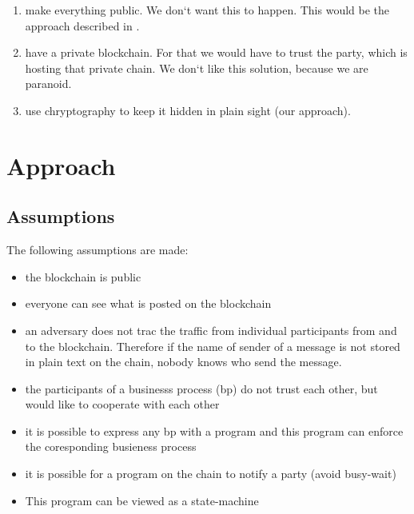 \documentclass[runningheads]{llncs}
\begin{document}
\begin{enumerate}
    \item make everything public. We don`t want this to happen. This would be the approach described in \cite{weber2016untrusted}.
    \item have a private blockchain. For that we would have to trust the party, which is hosting that private chain. We don`t like this solution, because we are paranoid. 
    \item use chryptography to keep it hidden in plain sight (our approach).
\end{enumerate}

\section{Approach}
\subsection{Assumptions}
The following assumptions are made: 
\begin{itemize}
    \item the blockchain is public
    \item everyone can see what is posted on the blockchain
    \item an adversary does not trac the traffic from individual participants from and to the blockchain. Therefore if the name of sender of a message is not stored in plain text on the chain, nobody knows who send the message.
    \item the participants of a businesss process (bp) do not trust each other, but would like to cooperate with each other
    \item it is possible to express any bp with a program and this program can enforce the coresponding busieness process
    \item it is possible for a program on the chain to notify a party (avoid busy-wait) 
    \item This program can be viewed as a state-machine
\end{itemize}
\end{document}
